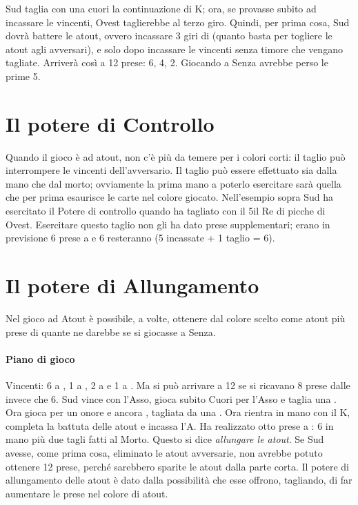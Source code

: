 \documentclass[../corsofiori.tex]{subfiles}
\begin{document}
\showAll*

Sud taglia con una cuori la continuazione di K\Sp; ora, se provasse subito ad incassare le \qu vincenti, Ovest
taglierebbe al terzo giro. Quindi, per prima cosa, Sud dovrà battere le atout, ovvero incassare 3 giri di \cu (quanto
basta per togliere le atout agli avversari), e solo dopo incassare le vincenti senza timore che vengano tagliate.
Arriverà così a 12 prese: 6\He, 4\Di, 2\Cl. Giocando a Senza avrebbe perso le prime 5.


\section{Il potere di Controllo}
Quando il gioco è ad atout, non c’è più da temere per i colori corti: il taglio può interrompere le vincenti
dell’avversario. Il taglio può essere effettuato sia dalla mano che dal morto; ovviamente la prima mano a poterlo
esercitare sarà quella che per prima esaurisce le carte nel colore giocato. Nell’esempio sopra Sud ha esercitato il
Potere di controllo quando ha tagliato con il 5\He il Re di picche di Ovest.
Esercitare questo taglio non gli ha dato prese supplementari; erano in previsione 6 prese a \cu e 6 resteranno (5
incassate + 1 taglio = 6).

\section{Il potere di Allungamento}
Nel gioco ad Atout è possibile, a volte, ottenere dal colore scelto come atout più prese di quante ne darebbe se si
giocasse a Senza.

\newgame
{}
\leftupper{\boardtext*}%
{\dealertext\quad}{\vulnertext}

\showAll*

\paragraph{Piano di gioco} Vincenti: 6 a \pic, 1 a \cu, 2 a \qu e 1 a \fio.
Ma si può arrivare a 12 se si ricavano 8 prese dalle \pic invece che 6.
Sud vince con l'Asso, gioca subito Cuori per l'Asso e taglia una \cu. Ora gioca \pic per un onore e ancora \cu, tagliata
da una \pic. Ora rientra in mano con il K\Di, completa la battuta delle atout e incassa l'A\Di. Ha realizzato otto prese
a \pic: 6 in mano più due tagli fatti al Morto. Questo si dice \emph{allungare le atout}. Se Sud avesse, come prima
cosa, eliminato le atout avversarie, non avrebbe potuto ottenere 12 prese, perché sarebbero sparite le atout dalla parte
corta. Il potere di allungamento delle atout è dato dalla possibilità che esse offrono, tagliando, di far aumentare le prese
nel colore di atout.
\end{document}
